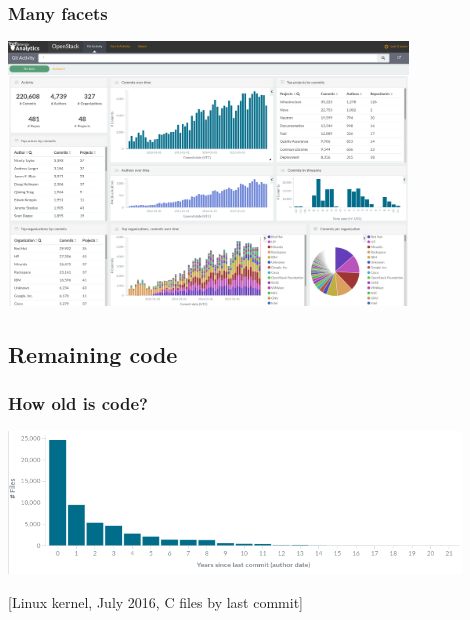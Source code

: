\documentclass[17pt,aspectratio=169,hyperref=pdfusetitle]{beamer}
\begin{document}
\begin{frame}
\frametitle{Many facets}

\begin{center}
  \includegraphics[height=7cm]{figs/bitergia-analytics-fosdem16}
\end{center}

\end{frame}

\subsection{Remaining code}

\begin{frame}
  \frametitle{How old is code?}
  
\begin{center}
  \includegraphics[width=12cm]{figs/linux-files-age}
\end{center}

[Linux kernel, July 2016, C files by last commit]

\end{frame}
\end{document}
